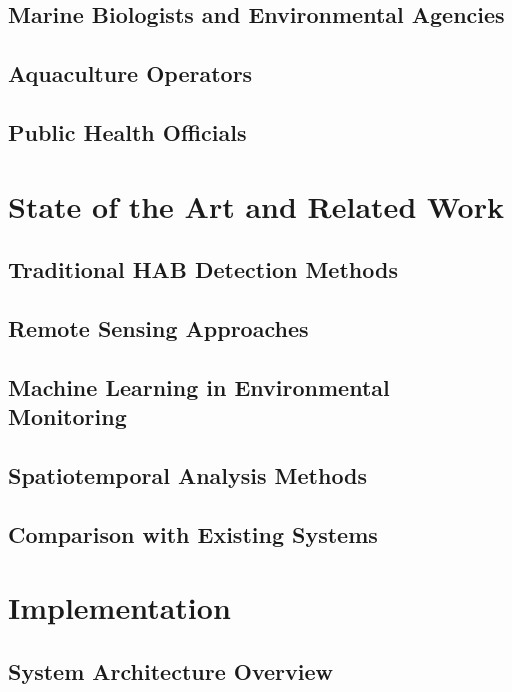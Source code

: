 \documentclass[conference]{IEEEtran}
\begin{document}
\subsection{Marine Biologists and Environmental Agencies}

\subsection{Aquaculture Operators}

\subsection{Public Health Officials}

\section{State of the Art and Related Work}

\subsection{Traditional HAB Detection Methods}

\subsection{Remote Sensing Approaches}

\subsection{Machine Learning in Environmental Monitoring}

\subsection{Spatiotemporal Analysis Methods}

\subsection{Comparison with Existing Systems}

\section{Implementation}

\subsection{System Architecture Overview}
\end{document}
